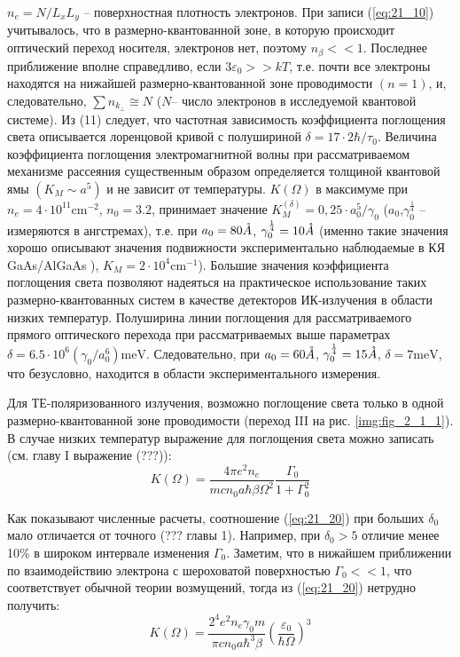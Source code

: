 { $n_{e} =N/L_{x} L_{y} $ – поверхностная плотность электронов. При записи (\ref{eq:21_10}) учитывалось, что в размерно-квантованной зоне, в которую происходит оптический переход носителя, электронов нет, поэтому  $n_{\beta } <<1$. Последнее приближение вполне справедливо, если  $3\varepsilon _{0} >>kT$, т.е. почти все электроны находятся на нижайшей размерно-квантованной зоне проводимости $(n=1)$, и, следовательно,   $\sum n_{k_{\bot } } \cong N$ ($N$– число электронов в исследуемой квантовой системе). Из (11) следует, что частотная зависимость коэффициента поглощения света описывается лоренцовой кривой с полушириной  $\delta =17\cdot 2\hbar /\tau _{0} $. Величина коэффициента поглощения электромагнитной волны при рассматриваемом механизме рассеяния существенным образом определяется толщиной квантовой ямы $\left(K_{M} \sim a^{5} \right)$ и не зависит от температуры. $K\left(\Omega \right)$  в максимуме при $n_{e} =4\cdot 10^{11} \text{cm}^{-2} $, $n_{0} =3.2$,   принимает значение   $K_{M}^{\left(\delta \right)} =0,25\cdot a_{0}^{5} /\gamma _{0} $ ($a_{0} $,$\gamma _{0}^{\frac{1}{4}} $ – измеряются в ангстремах), т.е. при  $a_{0} = 80 \AA$,  $\gamma _{0}^{\frac{1}{4}} = 10 \AA$ (именно такие значения   хорошо описывают значения подвижности   экспериментально наблюдаемые в КЯ GaAs/AlGaAs \cite{West1985}), $K_{M} =2\cdot 10^{4} \text{cm}^{-1} $). Большие значения коэффициента поглощения света позволяют надеяться на практическое использование таких размерно-квантованных систем в качестве детекторов ИК-излучения в области низких температур. Полуширина линии поглощения для рассматриваемого прямого оптического перехода при рассматриваемых выше параметрах $\delta =6.5\cdot 10^{6} \left(\gamma _{0} /a_{0}^{6} \right)\text{meV}$. Следовательно, при  $a_{0} = 60 \AA$,  $\gamma _{0}^{\frac{1}{4}} = 15 \AA$,  $\delta = 7 \text{meV}$, что безусловно, находится в области экспериментального измерения.

Для ТЕ-поляризованного излучения, возможно поглощение света только в одной размерно-квантованной зоне проводимости (переход III на рис. \ref{img:fig_2_1_1}). В случае низких температур выражение для поглощения света можно записать (см. главу I выражение (???)):
\begin{equation} \label{eq:21_20}
K(\Omega )=\frac{4\pi e^{2} n_{e} }{mcn_{0} a\hbar \beta \Omega ^{2} } \frac{\Gamma _{0} }{1+\Gamma _{0}^{2} }
\end{equation} 

Как показывают численные расчеты, соотношение (\ref{eq:21_20}) при больших $\delta $${}_{0}$ мало отличается от точного (??? главы 1). Например, при $\delta_{0} > 5$ отличие менее 10\% в широком интервале изменения $\Gamma_{0}$. Заметим, что в нижайшем приближении по взаимодействию электрона с шероховатой поверхностью $\Gamma_{0}<<1$, что соответствует обычной теории возмущений, тогда из (\ref{eq:21_20}) нетрудно получить:
\begin{equation} \label{eq:21_30}
K(\Omega )=\frac{2^{4} e^{2} n_{e} \gamma _{0} m}{\pi cn_{0} a\hbar ^{3} \beta } \left(\frac{\varepsilon _{0} }{\hbar \Omega } \right)^{3}
\end{equation} 

}

